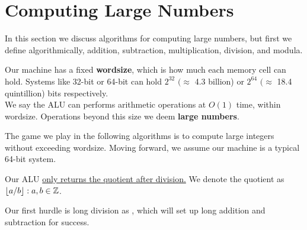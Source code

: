 \section{Computing Large Numbers}
\noindent
In this section we discuss algorithms for computing large numbers, but first we define 
algorithmically, addition, subtraction, multiplication, division, and modula.

\begin{Def}[Wordsize]

    Our machine has a fixed \textbf{wordsize}, which is how much each memory cell can hold. Systems like 32-bit or 64-bit can hold $2^{32}$ $(\approx$ 4.3 billion) or $2^{64}$ $(\approx$ 18.4 quintillion) bits respectively.\\

    \noindent
    We say the ALU can performs arithmetic operations at $O(1)$ time, within wordsize. Operations beyond this size we deem \textbf{large numbers}.
\end{Def}
\noindent
The game we play in the following algorithms is to compute large integers without exceeding wordsize. Moving forward, we assume our machine is a typical 64-bit system.

\newpage
\begin{Def}

    Our ALU  \underline{only returns the quotient after division.} We denote the quotient as $\floor*{a/b}:a,b\in\Z$.
\end{Def}

\noindent
Our first hurdle is long division as , which will set up long addition and subtraction for success.

